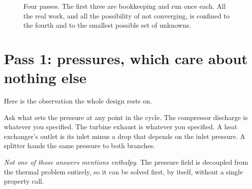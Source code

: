 \documentclass[11pt,a4paper]{report}
\begin{document}
\begin{figure}[htbp]
\centering
{}
\caption{Four passes. The first three are bookkeeping and run once each. All
the real work, and all the possibility of not converging, is confined to the
fourth and to the smallest possible set of unknowns.}
\label{fig:passes}
\end{figure}

\section{Pass 1: pressures, which care about nothing else}

Here is the observation the whole design rests on.

Ask what sets the pressure at any point in the cycle. The compressor
discharge is whatever you specified. The turbine exhaust is whatever you
specified. A heat exchanger's outlet is its inlet minus a drop that depends
on the inlet pressure. A splitter hands the same pressure to both branches.

\emph{Not one of those answers mentions enthalpy.} The pressure field is
decoupled from the thermal problem entirely, so it can be solved first, by
itself, without a single property call.
\end{document}
